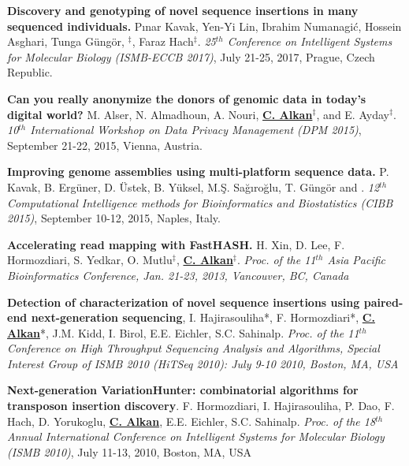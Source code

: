   \vspace{-.2cm}        
         {\bf Discovery and genotyping of novel sequence insertions in many sequenced individuals.}
         Pınar Kavak, Yen-Yi Lin, Ibrahim Numanagić, Hossein Asghari, Tunga Güngör, \calkan{}$^\ddag$, Faraz Hach$^\ddag$.
         {\em 25$^{th}$ Conference on Intelligent Systems for Molecular Biology (ISMB-ECCB 2017)}, July 21-25, 2017, Prague, Czech Republic.



\vspace{-.2cm}
{\bf Can you really anonymize the donors of genomic data in today's digital world?}
M. Alser, N. Almadhoun, A. Nouri, {\bf {\underline{C. Alkan}}}$^\ddag$, and E. Ayday$^\ddag$. 
{\em 10$^{th}$ International Workshop on Data Privacy Management (DPM 2015)}, 
 September 21-22, 2015, Vienna, Austria.


\vspace{-.2cm}

{\bf Improving genome assemblies using multi-platform sequence data.}
P. Kavak, B. Ergüner, D. Üstek, B. Yüksel, M.Ş. Sağıroğlu, T. Güngör and \calkan{}.
{\em 12$^{th}$ Computational Intelligence methods for Bioinformatics and Biostatistics (CIBB 2015)}, 
 September 10-12, 2015, Naples, Italy.


\vspace{-.2cm}
{\bf Accelerating read mapping with FastHASH.}
H. Xin, D. Lee, F. Hormozdiari, S. Yedkar, O. Mutlu$^\ddag$, {\bf {\underline {C. Alkan}}}$^\ddag$.
{\em  Proc. of the 11$^{th}$  Asia Pacific Bioinformatics Conference,
Jan. 21-23, 2013, Vancouver, BC, Canada}

\vspace{-.2cm}
{\bf Detection of characterization of novel sequence insertions using paired-end next-generation sequencing},
 I. Hajirasouliha*, F. Hormozdiari*, {\bf {\underline{C. Alkan}}}*, J.M. Kidd, I. Birol, E.E. Eichler,
 S.C. Sahinalp.
{\em  Proc. of the 11$^{th}$  Conference on High Throughput Sequencing Analysis and Algorithms, Special Interest
Group of ISMB 2010 (HiTSeq 2010): July 9-10 2010, Boston, MA, USA}

\vspace{-.2cm}
{\bf Next-generation VariationHunter: combinatorial algorithms for transposon insertion discovery}.
F. Hormozdiari, I. Hajirasouliha, P. Dao, F. Hach, D. Yorukoglu, {\bf {\underline{C. Alkan}}},
 E.E. Eichler, S.C. Sahinalp.
{\em Proc. of the 18$^{th}$ Annual International Conference on Intelligent Systems
for Molecular Biology (ISMB 2010)}, July 11-13, 2010, Boston, MA, USA


